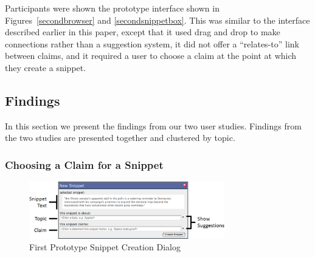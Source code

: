 \documentclass{chi2009}
\begin{document}
Participants were shown the prototype interface shown in Figures~\ref{secondbrowser} and \ref{secondsnippetbox}. This was similar to the interface described earlier in this paper, except that it used drag and drop to make connections rather than a suggestion system, it did not offer a ``relates-to'' link between claims, and it required a user to choose a claim at the point at which they create a snippet. 

\subsection{Findings}

In this section we present the findings from our two user studies. Findings from the two studies are presented together and clustered by topic.

% 
% 
% 

\subsubsection{Choosing a Claim for a Snippet}

\begin{figure}[t]
	\includegraphics[width=8.5cm]{../screenshots/oldsnipcreate_diagram.png}
	\caption{First Prototype Snippet Creation Dialog}
	\label{oldsnippetbox}
\end{figure}
\end{document}
